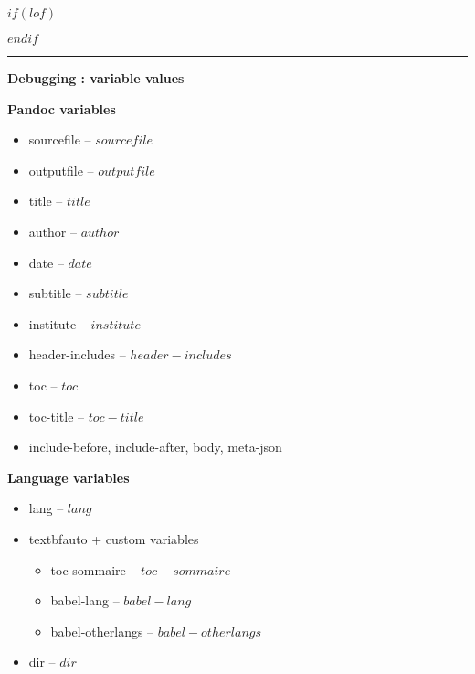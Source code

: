 \documentclass[$if(fontsize)$$fontsize$,$endif$$if(lang)$$babel-lang$,$endif$$if(papersize)$$papersize$paper,$endif$$for(classoption)$$classoption$$sep$,$endfor$]{$documentclass$}
\begin{document}
$if(lof)$
\listoffigures
$endif$



{
\begin{centering}
\rule{2in}{0.4pt} 

\Large{\textbf{Debugging : variable values}}

\end{centering}


\textbf{Pandoc variables}

\begin{itemize}
        \item sourcefile -- $sourcefile$
        \item outputfile -- $outputfile$
        \item title -- $title$
        \item author -- $author$ %
        \item date -- $date$
        \item subtitle -- $subtitle$
        \item institute -- $institute$
        \item header-includes -- $header-includes$
        \item toc -- $toc$
        \item toc-title -- $toc-title$ %
        \item include-before, include-after, body, meta-json
\end{itemize}


\textbf{Language variables}
\begin{itemize}
        \item lang -- $lang$
        \item textbf{auto + custom variables}
        \begin{itemize}
                \item toc-sommaire -- $toc-sommaire$
                \item babel-lang -- $babel-lang$
                \item babel-otherlangs -- $babel-otherlangs$
        \end{itemize}
        \item dir -- $dir$ %
\end{itemize}


}
\end{document}
